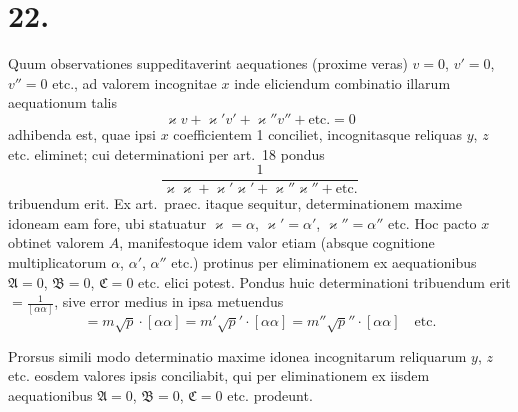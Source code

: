 \documentclass[12pt,a4paper]{book}
\begin{document}
\section*{22.}
\label{sec:art22}

Quum observationes suppeditaverint aequationes (proxime veras) $v=0$, $v'=0$, $v''=0$ etc., ad valorem incognitae $x$ inde eliciendum combinatio illarum aequationum talis
%
\begin{equation*}
\varkappa v+\varkappa'v'+\varkappa''v''+\text{etc.}=0
\end{equation*}
adhibenda est, quae ipsi $x$ coefficientem 1 conciliet, incognitasque reliquas $y$, $z$ etc. eliminet; cui determinationi per art.~18 pondus
%
\begin{equation*}
\frac{1}{\varkappa\varkappa+\varkappa'\varkappa'+\varkappa''\varkappa''+\text{etc.}}
\end{equation*}
tribuendum erit. Ex art.~praec. itaque sequitur, determinationem maxime idoneam eam fore, ubi statuatur $\varkappa=\alpha$, $\varkappa'=\alpha'$, $\varkappa''=\alpha''$ etc. Hoc pacto $x$ obtinet valorem $A$, manifestoque idem valor etiam (absque cognitione multiplicatorum $\alpha$, $\alpha'$, $\alpha''$ etc.) protinus per eliminationem ex aequationibus $\mathfrak{A}=0$, $\mathfrak{B}=0$, $\mathfrak{C}=0$ etc. elici potest. Pondus huic determinationi tribuendum erit $=\tfrac{1}{[\alpha\alpha]}$, sive error medius in ipsa metuendus
%
\begin{equation*}
=m\surd p\cdot[\alpha\alpha]=m'\surd p'\cdot[\alpha\alpha]=m''\surd p''\cdot[\alpha\alpha]\quad\text{etc.}
\end{equation*}

Prorsus simili modo determinatio maxime idonea incognitarum reliquarum $y$, $z$ etc. eosdem valores ipsis conciliabit, qui per eliminationem ex iisdem aequationibus $\mathfrak{A}=0$, $\mathfrak{B}=0$, $\mathfrak{C}=0$ etc. prodeunt.
\end{document}
